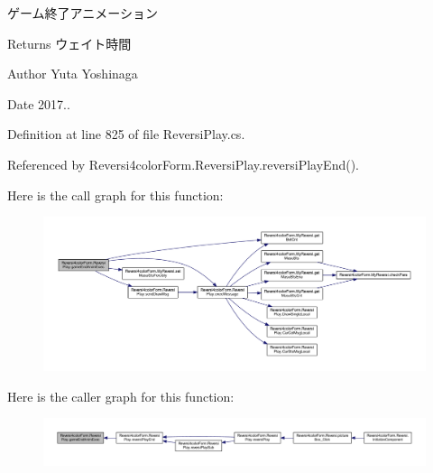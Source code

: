 ゲーム終了アニメーション 

\begin{DoxyReturn}{Returns}
ウェイト時間 
\end{DoxyReturn}
\begin{DoxyAuthor}{Author}
Yuta Yoshinaga 
\end{DoxyAuthor}
\begin{DoxyDate}{Date}
2017.. 
\end{DoxyDate}


Definition at line 825 of file Reversi\+Play.\+cs.



Referenced by Reversi4color\+Form.\+Reversi\+Play.\+reversi\+Play\+End().

Here is the call graph for this function\+:
\nopagebreak
\begin{figure}[H]
\begin{center}
\leavevmode
\includegraphics[width=350pt]{class_reversi4color_form_1_1_reversi_play_a1f415a175312ca4d39d36685d3404311_cgraph}
\end{center}
\end{figure}
Here is the caller graph for this function\+:
\nopagebreak
\begin{figure}[H]
\begin{center}
\leavevmode
\includegraphics[width=350pt]{class_reversi4color_form_1_1_reversi_play_a1f415a175312ca4d39d36685d3404311_icgraph}
\end{center}
\end{figure}
\mbox{\label{class_reversi4color_form_1_1_reversi_play_a037f282ad4aeb2807a0108cbbb82fd02}} 
